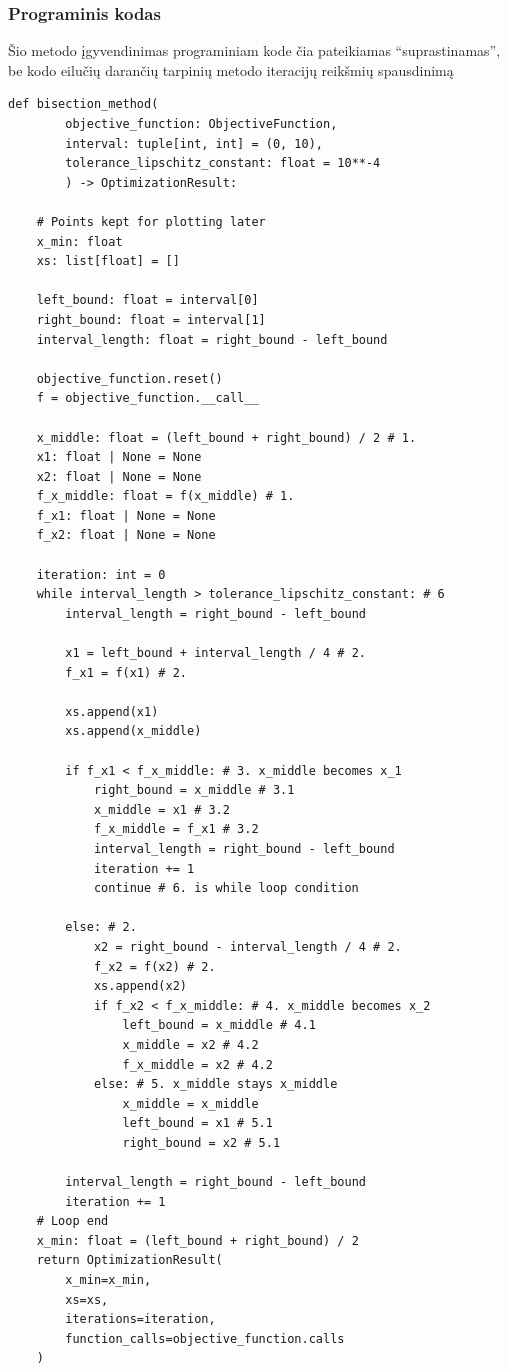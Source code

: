 \documentclass[lithuanian,a4paper,12pt]{article}
\begin{document}
\pagebreak
\subsubsection*{Programinis kodas}
Šio metodo įgyvendinimas programiniam kode čia pateikiamas ``suprastinamas'', be kodo eilučių darančių tarpinių metodo iteracijų reikšmių spausdinimą

\begin{verbatim}
def bisection_method(
        objective_function: ObjectiveFunction, 
        interval: tuple[int, int] = (0, 10), 
        tolerance_lipschitz_constant: float = 10**-4
        ) -> OptimizationResult:
    
    # Points kept for plotting later
    x_min: float
    xs: list[float] = []
    
    left_bound: float = interval[0]
    right_bound: float = interval[1]
    interval_length: float = right_bound - left_bound

    objective_function.reset()
    f = objective_function.__call__

    x_middle: float = (left_bound + right_bound) / 2 # 1.
    x1: float | None = None
    x2: float | None = None
    f_x_middle: float = f(x_middle) # 1.
    f_x1: float | None = None
    f_x2: float | None = None

    iteration: int = 0
    while interval_length > tolerance_lipschitz_constant: # 6
        interval_length = right_bound - left_bound
            
        x1 = left_bound + interval_length / 4 # 2.
        f_x1 = f(x1) # 2.

        xs.append(x1)
        xs.append(x_middle)
        
        if f_x1 < f_x_middle: # 3. x_middle becomes x_1
            right_bound = x_middle # 3.1
            x_middle = x1 # 3.2
            f_x_middle = f_x1 # 3.2
            interval_length = right_bound - left_bound
            iteration += 1
            continue # 6. is while loop condition

        else: # 2.
            x2 = right_bound - interval_length / 4 # 2.
            f_x2 = f(x2) # 2.
            xs.append(x2)
            if f_x2 < f_x_middle: # 4. x_middle becomes x_2
                left_bound = x_middle # 4.1 
                x_middle = x2 # 4.2 
                f_x_middle = x2 # 4.2
            else: # 5. x_middle stays x_middle
                x_middle = x_middle
                left_bound = x1 # 5.1 
                right_bound = x2 # 5.1

        interval_length = right_bound - left_bound
        iteration += 1
    # Loop end
    x_min: float = (left_bound + right_bound) / 2
    return OptimizationResult(
        x_min=x_min, 
        xs=xs, 
        iterations=iteration, 
        function_calls=objective_function.calls
    )
\end{verbatim}
\end{document}
